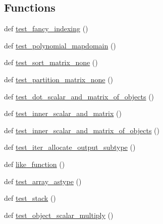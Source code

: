 \subsection*{Functions}
\begin{DoxyCompactItemize}
\item 
def \hyperlink{namespacenumpy_1_1matrixlib_1_1tests_1_1test__interaction_ab782d6854d2fc5ac2bcaa40e226db97b}{test\+\_\+fancy\+\_\+indexing} ()
\item 
def \hyperlink{namespacenumpy_1_1matrixlib_1_1tests_1_1test__interaction_a48796784a06bf79379c7260a3eac23da}{test\+\_\+polynomial\+\_\+mapdomain} ()
\item 
def \hyperlink{namespacenumpy_1_1matrixlib_1_1tests_1_1test__interaction_a49ce88cf0936eb746a0df5955b0033b9}{test\+\_\+sort\+\_\+matrix\+\_\+none} ()
\item 
def \hyperlink{namespacenumpy_1_1matrixlib_1_1tests_1_1test__interaction_aff02db5e73d794ea3620b705857b01c5}{test\+\_\+partition\+\_\+matrix\+\_\+none} ()
\item 
def \hyperlink{namespacenumpy_1_1matrixlib_1_1tests_1_1test__interaction_a5edb73410645137b092c6b3f523769ab}{test\+\_\+dot\+\_\+scalar\+\_\+and\+\_\+matrix\+\_\+of\+\_\+objects} ()
\item 
def \hyperlink{namespacenumpy_1_1matrixlib_1_1tests_1_1test__interaction_a85d28b6cc5b2bea76e5672814b24df59}{test\+\_\+inner\+\_\+scalar\+\_\+and\+\_\+matrix} ()
\item 
def \hyperlink{namespacenumpy_1_1matrixlib_1_1tests_1_1test__interaction_aca45854816d18a013636f7072ea55ca2}{test\+\_\+inner\+\_\+scalar\+\_\+and\+\_\+matrix\+\_\+of\+\_\+objects} ()
\item 
def \hyperlink{namespacenumpy_1_1matrixlib_1_1tests_1_1test__interaction_a57779b230faab494d57f0ee6c27a7908}{test\+\_\+iter\+\_\+allocate\+\_\+output\+\_\+subtype} ()
\item 
def \hyperlink{namespacenumpy_1_1matrixlib_1_1tests_1_1test__interaction_a321d4978d6c3dbfde00f4a7c135b4e92}{like\+\_\+function} ()
\item 
def \hyperlink{namespacenumpy_1_1matrixlib_1_1tests_1_1test__interaction_aa62bc19d2a4dfcc5c235aa7c8895f327}{test\+\_\+array\+\_\+astype} ()
\item 
def \hyperlink{namespacenumpy_1_1matrixlib_1_1tests_1_1test__interaction_a8e67b29a2b73eb6a4442c27b1dd625f5}{test\+\_\+stack} ()
\item 
def \hyperlink{namespacenumpy_1_1matrixlib_1_1tests_1_1test__interaction_a650ad6412181aaddbea92faec87fe9b9}{test\+\_\+object\+\_\+scalar\+\_\+multiply} ()

\end{DoxyCompactItemize}
